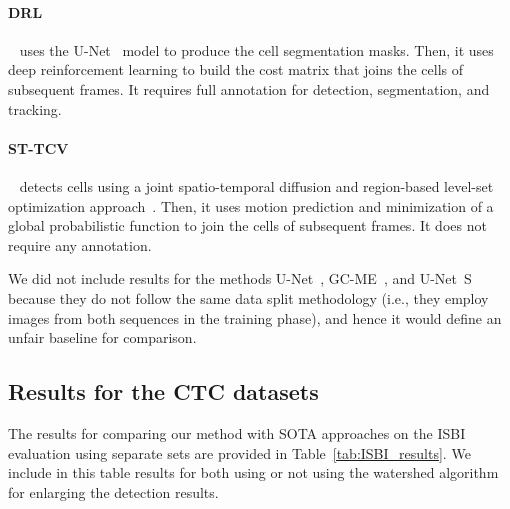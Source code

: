 \documentclass{article}
\begin{document}
\paragraph{DRL}~\cite{drl} uses the U-Net~\cite{unet} model to produce the cell segmentation masks. Then, it uses deep reinforcement learning to build the cost matrix that joins the cells of subsequent frames. It requires full annotation for detection, segmentation, and tracking.

\paragraph{ST-TCV}~\cite{boukari2018automated} detects cells using a joint spatio-temporal diffusion and region-based level-set optimization approach~\cite{boukari2016joint}. Then, it uses motion prediction and minimization of a global probabilistic function to join the cells of subsequent frames. It does not require any annotation.

We did not include results for the methods U-Net~\cite{unet}, GC-ME~\cite{gcme}, and U-Net~S~\cite{unets} because they do not follow the same data split methodology (i.e., they employ images from both sequences in the training phase), and hence it would define an unfair baseline for comparison.

\subsection{Results for the CTC datasets}
The results for comparing our method with SOTA approaches on the ISBI evaluation using separate sets are provided in Table~\ref{tab:ISBI_results}. We include in this table results for both using or not using the watershed algorithm for enlarging the detection results.
\end{document}
